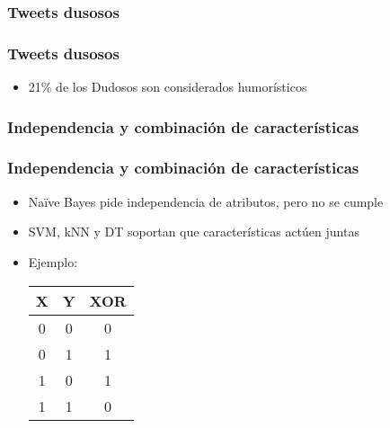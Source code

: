 \subsubsection{Tweets dusosos}
\begin{frame}
    \frametitle{Tweets dusosos}

    \begin{itemize}
        \item 21\% de los Dudosos son considerados humorísticos
    \end{itemize}
\end{frame}

\subsubsection{Independencia y combinación de características}
\begin{frame}
    \frametitle{Independencia y combinación de características}

    \begin{itemize}[<+->]
        \item Naïve Bayes pide independencia de atributos, pero no se cumple
        \item SVM, kNN y DT soportan que características actúen juntas
        \item Ejemplo:

        \begin{center}
            \begin{tabular}{ c | c | c }
                X & Y & XOR \\
                \hline
                0 & 0 & 0 \\
                \hline
                0 & 1 & 1 \\
                \hline
                1 & 0 & 1 \\
                \hline
                1 & 1 & 0 \\
            \end{tabular}
        \end{center}
    \end{itemize}
\end{frame}
